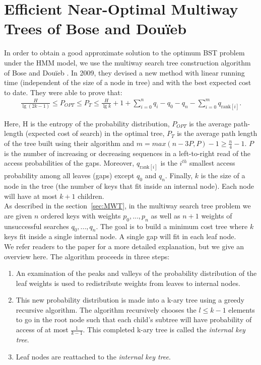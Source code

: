 \documentclass[letterpaper,12pt,titlepage,oneside,final]{book}
\theoremstyle{plain}
\begin{document}
\section{Efficient Near-Optimal Multiway Trees of Bose and Dou\"{i}eb}\label{43}

In order to obtain a good approximate solution to the optimum BST problem under the HMM model, we use the multiway search tree construction algorithm of Bose and Dou\"{i}eb \cite{bose2009efficient}. In 2009, they devised a new method with linear running time (independent of the size of a node in tree) and with the best expected cost to date. They were able to prove that:
\begin{align*}
\frac{H}{\lg(2k-1)} \leq P_{OPT} \leq P_T \leq \frac{H}{\lg k} + 1 + \sum_{i=0}^n q_i - q_0 - q_n - \sum_{i=0}^m q_{\text{rank}[i]}.
\end{align*}

Here, H is the entropy of the probability distribution, $P_{OPT}$ is the average path-length (expected cost of search) in the optimal tree, $P_T$ is the average path length of the tree built using their algorithm and $m=max({n-3P,P})-1 \geq \frac{n}{4} - 1$. $P$ is the number of increasing or decreasing sequences in a left-to-right read of the access probabilities of the gaps. Moreover, $q_{\text{rank}[i]}$ is the $i^{th}$ smallest access probability among all leaves (gaps) except $q_0$ and $q_n$. Finally, $k$ is the size of a node in the tree (the number of keys that fit inside an internal node). Each node will have at most $k+1$ children. \\

As described in the section~\ref{sec:MWT}, in the multiway search tree problem we are given $n$ ordered keys with weights $p_0, ..., p_n$ as well as $n+1$ weights of unsuccessful searches $q_0,...,q_n$. The goal is to build a minimum cost tree where $k$ keys fit inside a single internal node. A single gap will fit in each leaf node. \\
 
We refer readers to the paper \cite{bose2009efficient} for a more detailed explanation, but we give an overview here. The algorithm proceeds in three steps: 
 
\begin{enumerate}
\item An examination of the peaks and valleys of the probability distribution of the leaf weights is used to redistribute weights from leaves to internal nodes. 

\item This new probability distribution is made into a k-ary tree using a greedy recursive algorithm. The algorithm recursively chooses the $l \leq k-1$ elements to go in the root node such that each child's subtree will have probability of access of at most $\frac{1}{k-1}$. This completed k-ary tree is called the \textit{internal key tree}. 

\item Leaf nodes are reattached to the \textit{internal key tree}.
\end{enumerate}
\end{document}
